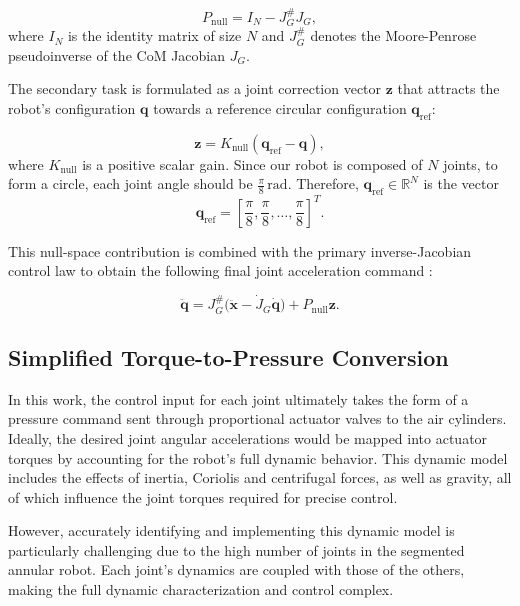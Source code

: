 \documentclass[a4paper, 10pt, conference]{ieeeconf}
\begin{document}
\begin{equation}
P_{\text{null}} = I_N - J_G^{\#} J_G,
\end{equation}
\noindent
where \( I_N \) is the identity matrix of size \( N \) and \( J_G^{\#} \) denotes the Moore-Penrose pseudoinverse of the CoM Jacobian \( J_G \).

The secondary task is formulated as a joint correction vector \( \mathbf{z} \) that attracts the robot’s configuration \( \mathbf{q} \) towards a reference circular configuration \( \mathbf{q}_{\text{ref}} \):

\begin{equation}
\mathbf{z} = K_{\text{null}} (\mathbf{q}_{\text{ref}} - \mathbf{q}),
\end{equation}
\noindent
where \( K_{\text{null}} \) is a positive scalar gain. Since our robot is composed of \( N \) joints, to form a circle, each joint angle should be \( \frac{\pi}{8}\,\mathrm{rad} \). Therefore, \( \mathbf{q}_{\text{ref}} \in \mathbb{R}^N \) is the vector
\[
\mathbf{q}_{\text{ref}} = \left[ \frac{\pi}{8}, \frac{\pi}{8}, \dots, \frac{\pi}{8} \right]^T.
\]

This null-space contribution is combined with the primary inverse-Jacobian control law to obtain the following final joint acceleration command :

\begin{equation}
    \ddot{\mathbf{q}} = J_G^{\#}\big(\ddot{\mathbf{x}} - \dot{J}_G \dot{\mathbf{q}}\big) + P_{\text{null}}\mathbf{z} .
		\label{eq:16}
\end{equation}


\subsection{Simplified Torque-to-Pressure Conversion}

In this work, the control input for each joint ultimately takes the form of a pressure command sent through proportional actuator valves to the air cylinders. Ideally, the desired joint angular accelerations would be mapped into actuator torques by accounting for the robot’s full dynamic behavior. This dynamic model includes the effects of inertia, Coriolis and centrifugal forces, as well as gravity, all of which influence the joint torques required for precise control.

However, accurately identifying and implementing this dynamic model is particularly challenging due to the high number of joints in the segmented annular robot. Each joint’s dynamics are coupled with those of the others, making the full dynamic characterization and control complex. 
\end{document}
